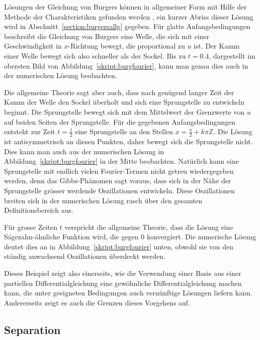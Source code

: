 Lösungen der Gleichung von Burgers können in allgemeiner Form mit
Hilfe der Methode der Charakteristiken gefunden werden \cite{skript:pde},
ein kurzer Abriss dieser Lösung wird in Abschnitt~\ref{section:burgersallg}
gegeben.
Für glatte Anfangsbedingungen beschreibt die Gleichung von Burgers eine
Welle, die sich mit einer Geschwindigkeit in $x$-Richtung bewegt, die
proportional zu $u$ ist.
Der Kamm einer Welle bewegt sich also schneller als der Sockel.
Bis zu $t=0.4$, dargestellt im obersten Bild von
Abbildung~\ref{skript:burgfourier},
kann man genau dies auch in der numerischen Lösung beobachten.

Die allgemeine Theorie sagt aber auch, dass nach genügend langer
Zeit der Kamm der Welle den Sockel überholt und sich eine Sprungstelle
zu entwickeln beginnt.
Die Sprungstelle bewegt sich mit dem Mittelwert der Grenzwerte von $u$
auf beiden Seiten der Sprungstelle.
Für die gegebenen Anfangsbedingungen entsteht zur Zeit $t=\frac12$
eine Sprungstelle an den Stellen $x=\frac{\pi}2+k\pi\mathbb Z$.
Die Lösung ist antisymmetrisch an diesen Punkten, daher bewegt sich
die Sprungstelle nicht.
Dies kann man auch aus der numerischen Lösung in
Abbildung~\ref{skript:burgfourier}
in der Mitte beobachten.
Natürlich kann eine Sprungstelle mit endlich vielen Fourier-Termen
nicht getreu wiedergegeben werden, denn das Gibbs-Phänomen sagt voraus,
dass sich in der Nähe der Sprungstelle grösser werdende Oszillationen
entwickeln.
Diese Oszillationen breiten sich in der numerischen Lösung rasch
über den gesamten Definitionsbereich aus.

Für grosse Zeiten $t$ verspricht die allgemeine Theorie, dass die Lösung
eine Sägezahn-ähnliche Funktion wird, die gegen $0$ konvergiert.
Die numerische Lösung deutet dies an in Abbildung~\ref{skript:burgfourier}
unten, obwohl sie von den ständig anwachsend Oszillationen überdeckt werden.

Dieses Beispiel zeigt also einerseits, wie die Verwendung einer Basis
aus einer partiellen Differentialgleichung
eine gewöhnliche Differentialgleichung machen kann, die unter geeigneten
Bedingungen auch vernünftige Lösungen liefern kann.
Andererseits zeigt es auch die Grenzen dieses Vorgehens auf.

\subsection{Separation}
%
